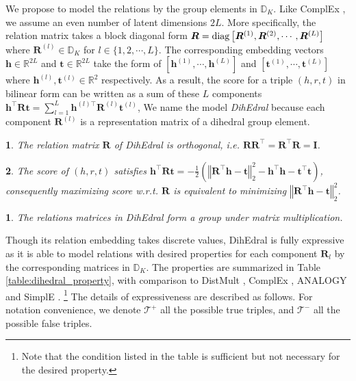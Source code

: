 \documentclass[11pt,a4paper]{article}
\newtheorem{thm}{\protect\theoremname}
\newtheorem{lma}{\protect\lemmaname}
\providecommand{\theoremname}{Theorem}
\providecommand{\lemmaname}{Lemma}
\begin{document}
We propose to model the relations by the group elements in $\mathbb{D}_{K}$.
Like ComplEx \cite{complex}, we assume an even number of latent dimensions $2L$. More specifically, the relation matrix takes a block diagonal
form $\bm{R}={\rm diag}\left[\bm{R}^{(1)},\bm{R}^{(2)},\cdots,\bm{R}^{(L)}\right]$
where $\bm{R}^{(l)}\in\mathbb{D}_{K}$ for $l\in\{1,2,\cdots,L\}$.
The corresponding embedding vectors $\bm{h} \in \mathbb{R}^{2L}$ and $\bm{t} \in \mathbb{R}^{2L}$ take the form of $\left[\bm{h}^{(1)}, \cdots, \bm{h}^{(L)}\right]$ and $\left[\bm{t}^{(1)}, \cdots, \bm{t}^{(L)}\right]$ where $\bm{h}^{(l)}, \bm{t}^{(l)} \in \mathbb{R}^2$ respectively. As a result, the score for a triple $(h,r,t)$ in bilinear form can be written as a sum of these $L$ components $\bm{h}^{\top}\bm{R}\bm{t} =\sum_{l=1}^{L}\bm{h}^{(l)\top}\bm{R}^{(l)}\bm{t}^{(l)}$,
We name the model  \textit{DihEdral} because each component $\bm{R}^{(l)}$ is a representation matrix of a dihedral group element. 

\begin{lma}\label{th:orth}
The relation matrix $\bm{R}$ of DihEdral is orthogonal, i.e. $\bm{R}\bm{R}^{\top}=\bm{R}^{\top}\bm{R}=\bm{I}$.
\end{lma}

\begin{lma}\label{th:equiv}
The score of $(h,r,t)$ satisfies $\bm{h}^\top \bm{R} \bm{t} = -\frac{1}{2}\left(\left\Vert\bm{R}^\top\bm{h}-\bm{t}\right\Vert_2^2-\bm{h}^\top \bm{h} -\bm{t}^\top \bm{t}\right)$, consequently maximizing score w.r.t. $\bm{R}$ is equivalent to minimizing $\left\Vert\bm{R}^\top\bm{h}-\bm{t}\right\Vert_2^2$.
\end{lma}

\begin{thm}\label{th:group}
The relations matrices in DihEdral form a group under matrix multiplication.
\end{thm}


Though its relation embedding takes discrete values, DihEdral is fully expressive as it is able to model relations with desired properties for each component $\bm{R}_l$ by the corresponding matrices in $\mathbb{D}_K$.  The properties are summarized in Table \ref{table:dihedral_property}, with comparison to DistMult \cite{distmult}, ComplEx \cite{complex}, ANALOGY \cite{analogy} and SimplE \cite{simple}. \footnote{Note that the condition listed in the table is sufficient but not necessary for the desired property.} The details of expressiveness are described as follows. For notation convenience, we denote $\mathcal{T}^{+} $ all the possible true triples, and $\mathcal{T}^{-}$ all the possible false triples.
\end{document}
